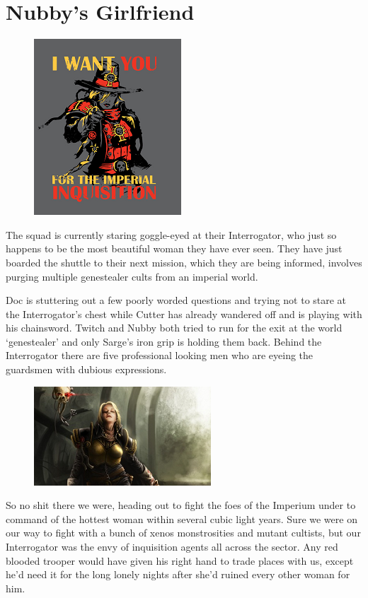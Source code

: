 \chapter{Nubby's Girlfriend}

\begin{figure}
	\begin{center}
		\includegraphics[width=\figwidth]{pics/5/1.png}
	\end{center}
\end{figure}
The squad is currently staring goggle-eyed at their Interrogator, who just so happens to be the most beautiful woman they have ever seen. 
They have just boarded the shuttle to their next mission, which they are being informed, involves purging multiple genestealer cults from an imperial world. 

Doc is stuttering out a few poorly worded questions and trying not to stare at the Interrogator’s chest while Cutter has already wandered off and is playing with his chainsword. 
Twitch and Nubby both tried to run for the exit at the world ‘genestealer’ and only Sarge’s iron grip is holding them back. 
Behind the Interrogator there are five professional looking men who are eyeing the guardsmen with dubious expressions.

\begin{figure}
	\begin{center}
		\includegraphics[width=\figwidth]{pics/5/2.png}
	\end{center}
\end{figure}
So no shit there we were, heading out to fight the foes of the Imperium under to command of the hottest woman within several cubic light years. 
Sure we were on our way to fight with a bunch of xenos monstrosities and mutant cultists, but our Interrogator was the envy of inquisition agents all across the sector. 
Any red blooded trooper would have given his right hand to trade places with us, except he’d need it for the long lonely nights after she’d ruined every other woman for him. 

